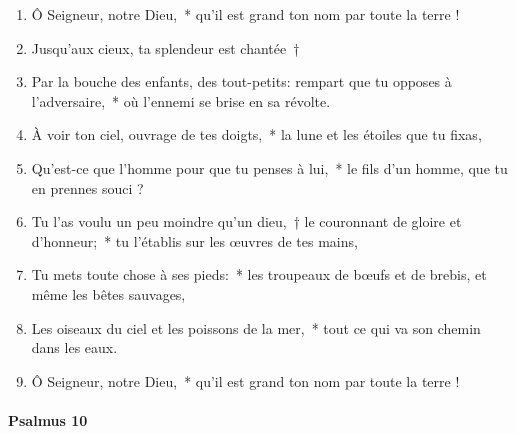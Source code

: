 \documentclass[twoside]{article}
\begin{document}
\begin{paracol}[1]{2}

\begin{enumerate}[wide, itemsep=0mm, labelwidth=!, labelindent=0pt, label=\color{gregoriocolor}\theenumi]
\item Ô Seigneur, notre Dieu,~* qu'il est grand ton nom par toute la terre ! 
\item Jusqu'aux cieux, ta splendeur est chantée~†
\item Par la bouche des enfants, des tout-petits: rempart que tu opposes à l'adversaire,~* où l'ennemi se brise en sa révolte.
\item À voir ton ciel, ouvrage de tes doigts,~* la lune et les étoiles que tu fixas,
\item Qu'est-ce que l'homme pour que tu penses à lui,~* le fils d'un homme, que tu en prennes souci ?
\item Tu l'as voulu un peu moindre qu'un dieu,~† le couronnant de gloire et d'honneur;~* tu l'établis sur les œuvres de tes mains,
\item Tu mets toute chose à ses pieds:~* les troupeaux de bœufs et de brebis, et même les bêtes sauvages,
\item Les oiseaux du ciel et les poissons de la mer,~* tout ce qui va son chemin dans les eaux.
\item Ô Seigneur, notre Dieu,~* qu'il est grand ton nom par toute la terre !
\end{enumerate}

\switchcolumn*
\paragraph{Psalmus 10}



\end{paracol}
\end{document}
